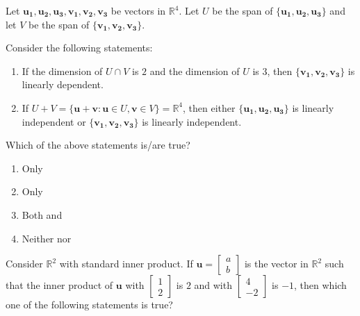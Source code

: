 
\iffalse
    \title{Assignment}
    \author{EE24BTECH11034}
    \section{st}
    \chapter{2024}
  \fi


\item Let $\mathbf{u_1}, \mathbf{u_2}, \mathbf{u_3}, \mathbf{v_1}, \mathbf{v_2}, \mathbf{v_3}$ be vectors in $\mathbb{R}^4$. Let $U$ be the span of $\{\mathbf{u_1}, \mathbf{u_2}, \mathbf{u_3}\}$ and let $V$ be the span of $\{\mathbf{v_1}, \mathbf{v_2}, \mathbf{v_3}\}$.

Consider the following statements:

\begin{enumerate}[label=\brak{\Roman*}]
\item If the dimension of $U \cap V$ is $2$ and the dimension of $U$ is $3$, then $\{\mathbf{v_1}, \mathbf{v_2}, \mathbf{v_3}\}$ is linearly dependent.

\item If $U + V = \{\mathbf{u} + \mathbf{v} : \mathbf{u} \in U, \mathbf{v} \in V\} = \mathbb{R}^4$, then either $\{\mathbf{u_1}, \mathbf{u_2}, \mathbf{u_3}\}$ is linearly independent or $\{\mathbf{v_1}, \mathbf{v_2}, \mathbf{v_3}\}$ is linearly independent.
\end{enumerate}

Which of the above statements is/are true?

\begin{enumerate}[label=\brak{\Alph*}]
\item Only 

\item Only 

\item Both  and 

\item Neither  nor 
\end{enumerate}


\item Consider $\mathbb{R}^2$ with standard inner product. If $\mathbf{u} = \begin{bmatrix} a \\ b \end{bmatrix}$ is the vector in $\mathbb{R}^2$ such that the inner product of $\mathbf{u}$ with $\begin{bmatrix} 1 \\ 2 \end{bmatrix}$ is $2$ and with $\begin{bmatrix} 4 \\ -2 \end{bmatrix}$ is $-1$, then which one of the following statements is true?

